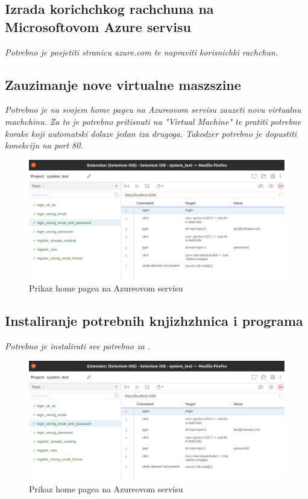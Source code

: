     \subsection{Izrada korichchkog rachchuna na Microsoftovom Azure servisu}
    \textit{Potrebno je posjetiti stranicu azure.com te napraviti korisnichki rachchun.}

    \subsection{Zauzimanje nove virtualne maszszine}
    \textit{Potrebno je na svojem home pageu na Azureovom servisu zauzeti novu virtualnu machchinu. Za to je potrebno pritisnuti na "Virtual Machine" te pratiti potrebne korake koji automatski dolaze jedan iza drugoga. Takodzer potrebno je dopustiti konekciju na port 80.}
    \begin{figure}[H]
        \includegraphics[width=\textwidth]{slike/tests_system/login_wrong_email_and_password.png} %
        \caption{Prikaz home pagea na Azureovom servisu}
        \label{fig:struktura} %
    \end{figure}

    \subsection{Instaliranje potrebnih knjizhzhnica i programa}
    \textit{Potrebno je instalirati sve potrebno za .}
    \begin{figure}[H]
        \includegraphics[width=\textwidth]{slike/tests_system/login_wrong_email_and_password.png} %
        \caption{Prikaz home pagea na Azureovom servisu}
        \label{fig:struktura} %
    \end{figure}

